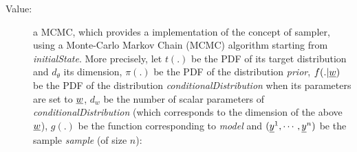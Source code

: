 \begin{description}
\item[Value:] a MCMC, which provides a implementation of the concept of
sampler, using a Monte-Carlo Markov Chain (MCMC) algorithm starting from
\textit{initialState}.
More precisely, let $t(.)$ be the PDF of its target distribution
and $d_\theta$ its dimension, $\pi(.)$ be the PDF of the distribution \textit{prior},
$f(.|{\underline{w}})$ be the PDF of the distribution \textit{conditionalDistribution}
when its parameters are set to ${\underline{w}}$, $d_w$ be the number of scalar
parameters of \textit{conditionalDistribution} (which corresponds to the dimension of
the above ${\underline{w}}$), $g(.)$ be the function corresponding to \textit{model}
and $({\underline{y}}^1,\cdots,{\underline{y}}^n)$ be the sample \textit{sample} (of size $n$):
\rule{0pt}{1em}


\end{description}
